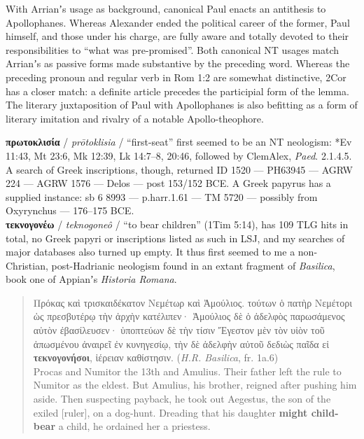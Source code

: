  With Arrianʼs usage as background, %
 canonical Paul enacts an antithesis to Apollophanes. %
 Whereas Alexander ended the political career of the former, %
 Paul himself, and those under his charge, are fully aware and totally devoted to their %
 responsibilities to “what was pre-promised”. %
 Both canonical NT usages match Arrianʼs as passive forms made substantive by the preceding word. %
 Whereas the preceding pronoun and regular verb in Rom 1:2 are somewhat distinctive, %
 2Cor has a closer match: a definite article precedes the participial form of the lemma. %
 The literary juxtaposition of Paul with Apollophanes is also befitting %
 as a form of literary imitation and rivalry of a notable Apollo-theophore. %

\noindent{}\textbf{πρωτοκλισία} / \textit{prōtoklisia} / “first-seat” %
first seemed to be an NT neologism: *Ev 11:43, Mt 23:6, Mk 12:39, Lk 14:7--8, 20:46, %
followed by ClemAlex, \textit{Paed}. 2.1.4.5. %
A search of Greek inscriptions, though, returned ID 1520 — PH63945 — AGRW 224 — AGRW 1576 — Delos — post 153/152 BCE. %
A Greek papyrus has a supplied instance: sb 6 8993 — p.harr.1.61 — TM 5720 — possibly from Oxyrynchus — 176--175 BCE. \\[1mm]

\noindent{}\textbf{τεκνογονέω} / \textit{teknogoneô} / “to bear children” (1Tim 5:14), %
has 109 TLG hits in total, no Greek papyri or inscriptions listed as such in LSJ, %
and my searches of major databases also turned up empty. %
It thus first seemed to me a non-Christian, post-Hadrianic neologism %
found in an extant fragment of \textit{Basilica}, %
book one of Appianʼs \textit{Historia Romana}. %

\vspace*{3mm}
 \begin{quote}Πρόκας καὶ τρισκαιδέκατον Νεμέτωρ καὶ Ἀμούλιος. %
 τούτων ὁ πατὴρ Νεμέτορι ὡς πρεσβυτέρῳ τὴν ἀρχὴν κατέλιπεν· %
 Ἀμούλιος δὲ ὁ ἀδελφὸς παρωσάμενος αὐτὸν ἐβασίλευσεν· %
 ὑποπτεύων δὲ τὴν τίσιν Ἔγεστον μὲν τὸν
 υἱὸν τοῦ ἀπωσμένου ἀναιρεῖ ἐν κυνηγεσίῳ, %
 τὴν δὲ ἀδελφὴν αὐτοῦ δεδιὼς παῖδα εἰ \textbf{τεκνογονήσοι}, ἱέρειαν καθίστησιν. %
 (\textit{H.R. Basilica}, fr. 1a.6) \\[1mm] %
 Procas and Numitor the 13th and Amulius. %
 Their father left the rule to Numitor as the eldest. %
 But Amulius, his brother, reigned after pushing him aside. %
 Then suspecting payback, he took out Aegestus, %
 the son of the exiled [ruler], on a dog-hunt. %
 Dreading that his daughter \textbf{might child-bear} a child, %
 he ordained her a priestess. \end{quote} %
 \vspace*{2mm}


